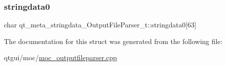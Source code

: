 \subsubsection{\texorpdfstring{stringdata0}{stringdata0}}
{\footnotesize\ttfamily char qt\+\_\+meta\+\_\+stringdata\+\_\+\+Output\+File\+Parser\+\_\+t\+::stringdata0\mbox{[}63\mbox{]}}



The documentation for this struct was generated from the following file\+:\begin{DoxyCompactItemize}
\item 
qtgui/moc/\mbox{\hyperlink{moc__outputfileparser_8cpp}{moc\+\_\+outputfileparser.\+cpp}}\end{DoxyCompactItemize}
